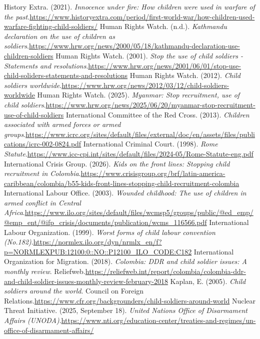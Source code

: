 \begin{referencelist}
   History Extra. (2021). \emph{Innocence under fire: How children were used in warfare of the past}.\url{https://www.historyextra.com/period/first-world-war/how-children-used-warfare-fighting-child-soldiers/}
   Human Rights Watch. (n.d.). \emph{Kathmandu declaration on the use of children as soldiers}.\url{https://www.hrw.org/news/2000/05/18/kathmandu-declaration-use-children-soldiers}
   Human Rights Watch. (2001). \emph{Stop the use of child soldiers - Statements and resolutions}.\url{https://www.hrw.org/news/2001/06/01/stop-use-child-soliders-statements-and-resolutions}
   Human Rights Watch. (2012). \emph{Child soldiers worldwide}.\url{https://www.hrw.org/news/2012/03/12/child-soldiers-worldwide}
   Human Rights Watch. (2025). \emph{Myanmar: Stop recruitment, use of child soldiers}.\url{https://www.hrw.org/news/2025/06/20/myanmar-stop-recruitment-use-of-child-soldiers}
   International Committee of the Red Cross. (2013). \emph{Children associated with armed forces or armed groups}.\url{https://www.icrc.org/sites/default/files/external/doc/en/assets/files/publications/icrc-002-0824.pdf}
   International Criminal Court. (1998). \emph{Rome Statute}.\url{https://www.icc-cpi.int/sites/default/files/2024-05/Rome-Statute-eng.pdf}
   International Crisis Group. (2026). \emph{Kids on the front lines: Stopping child recruitment in Colombia}.\url{https://www.crisisgroup.org/brf/latin-america-caribbean/colombia/b55-kids-front-lines-stopping-child-recruitment-colombia}
   International Labour Office. (2003). \emph{Wounded childhood: The use of children in armed conflict in Central Africa}.\url{https://www.ilo.org/sites/default/files/wcmsp5/groups/public/@ed_emp/@emp_ent/@ifp_crisis/documents/publication/wcms_116566.pdf}
   International Labour Organization. (1999). \emph{Worst forms of child labour convention (No.182)}.\url{https://normlex.ilo.org/dyn/nrmlx_en/f?p=NORMLEXPUB:12100:0::NO::P12100_ILO_CODE:C182}
   International Organization for Migration. (2018). \emph{Colombia: DDR and child soldier issues: A monthly review}. Reliefweb.\url{https://reliefweb.int/report/colombia/colombia-ddr-and-child-soldier-issues-monthly-review-february-2018}
   Kaplan, E. (2005). \emph{Child soldiers around the world}. Council on Foreign Relations.\url{https://www.cfr.org/backgrounders/child-soldiers-around-world}
   Nuclear Threat Initiative. (2025, September 18). \emph{United Nations Office of Disarmament Affairs (UNODA)}.\url{https://www.nti.org/education-center/treaties-and-regimes/un-office-of-disarmament-affairs/}

\end{referencelist}
